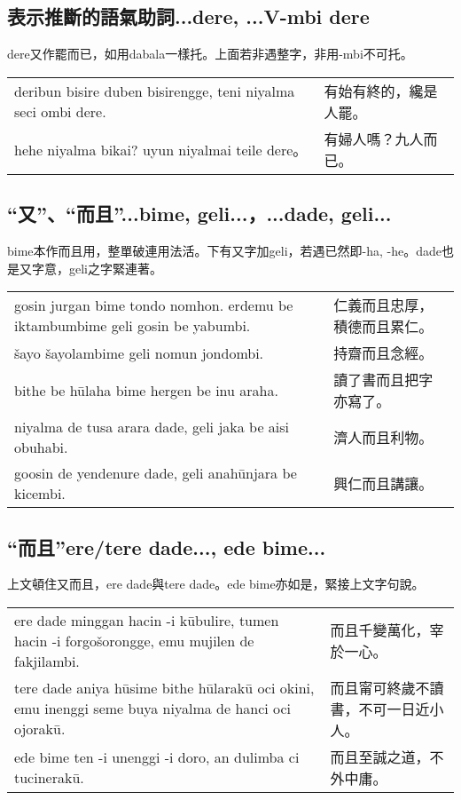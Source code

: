 \documentclass{article}
\begin{document}
\subsection{表示推斷的語氣助詞...dere, ...V-mbi dere}
\noindent dere又作罷而已，如用dabala一樣托。上面若非遇整字，非用-mbi不可托。
\begin{center}
    \begin{tabularx}{\textwidth}{XX}
        deribun bisire duben bisirengge, teni niyalma seci ombi dere. & 有始有終的，纔是人罷。\\
        hehe niyalma bikai? uyun niyalmai teile dere。& 有婦人嗎？九人而已。\\
    \end{tabularx}
\end{center}

\subsection{“又”、“而且”...bime, geli...，...dade, geli...}
\noindent bime本作而且用，整單破連用法活。下有又字加geli，若遇已然即-ha, -he。dade也是又字意，geli之字緊連著。
\begin{center}
    \begin{tabularx}{\textwidth}{XX}
        gosin jurgan bime tondo nomhon. erdemu be iktambumbime geli gosin be yabumbi. & 仁義而且忠厚，積德而且累仁。\\
        \v{s}ayo \v{s}ayolambime geli nomun jondombi. & 持齋而且念經。\\
        bithe be h\={u}laha bime hergen be inu araha. &讀了書而且把字亦寫了。\\
        niyalma de tusa arara dade, geli jaka be aisi obuhabi. & 濟人而且利物。\\
        goosin de yendenure dade, geli anah\={u}njara be kicembi. & 興仁而且講讓。
    \end{tabularx}
\end{center}

\subsection{“而且”ere/tere dade..., ede bime...}
\noindent 上文頓住又而且，ere dade與tere dade。ede bime亦如是，緊接上文字句說。
\begin{center}
    \begin{tabularx}{\textwidth}{XX}
        ere dade minggan hacin -i k\={u}bulire, tumen hacin -i forgo\v{s}orongge, emu mujilen de fakjilambi. & 而且千變萬化，宰於一心。\\
        tere dade aniya h\={u}sime bithe h\={u}larak\={u} oci okini, emu inenggi seme buya niyalma de hanci oci ojorak\={u}. & 而且甯可終歲不讀書，不可一日近小人。\\
        ede bime ten -i unenggi -i doro, an dulimba ci tucinerak\={u}. & 而且至誠之道，不外中庸。
    \end{tabularx}
\end{center}
\end{document}
